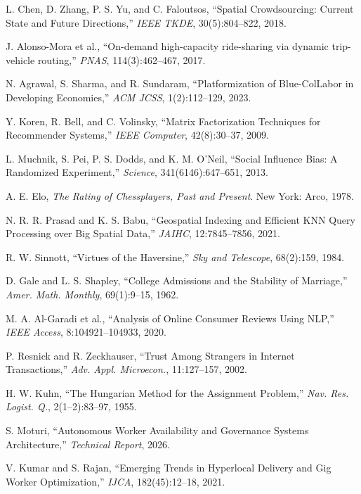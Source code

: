 \documentclass[10pt,twocolumn,a4paper]{article}
\begin{document}
\vspace{0.15em}
{\scriptsize
\setlength{\parskip}{0pt}
\setlength{\itemsep}{0pt}
\noindent [1] L. Chen, D. Zhang, P. S. Yu, and C. Faloutsos, ``Spatial Crowdsourcing: Current State and Future Directions,'' \textit{IEEE TKDE}, 30(5):804--822, 2018.\par
\noindent [2] J. Alonso-Mora et al., ``On-demand high-capacity ride-sharing via dynamic trip-vehicle routing,'' \textit{PNAS}, 114(3):462--467, 2017.\par
\noindent [3] N. Agrawal, S. Sharma, and R. Sundaram, ``Platformization of Blue-ColLabor in Developing Economies,'' \textit{ACM JCSS}, 1(2):112--129, 2023.\par
\noindent [4] Y. Koren, R. Bell, and C. Volinsky, ``Matrix Factorization Techniques for Recommender Systems,'' \textit{IEEE Computer}, 42(8):30--37, 2009.\par
\noindent [5] L. Muchnik, S. Pei, P. S. Dodds, and K. M. O'Neil, ``Social Influence Bias: A Randomized Experiment,'' \textit{Science}, 341(6146):647--651, 2013.\par
\noindent [6] A. E. Elo, \textit{The Rating of Chessplayers, Past and Present}. New York: Arco, 1978.\par
\noindent [7] N. R. R. Prasad and K. S. Babu, ``Geospatial Indexing and Efficient KNN Query Processing over Big Spatial Data,'' \textit{JAIHC}, 12:7845--7856, 2021.\par
\noindent [8] R. W. Sinnott, ``Virtues of the Haversine,'' \textit{Sky and Telescope}, 68(2):159, 1984.\par
\noindent [9] D. Gale and L. S. Shapley, ``College Admissions and the Stability of Marriage,'' \textit{Amer. Math. Monthly}, 69(1):9--15, 1962.\par
\noindent [10] M. A. Al-Garadi et al., ``Analysis of Online Consumer Reviews Using NLP,'' \textit{IEEE Access}, 8:104921--104933, 2020.\par
\noindent [11] P. Resnick and R. Zeckhauser, ``Trust Among Strangers in Internet Transactions,'' \textit{Adv. Appl. Microecon.}, 11:127--157, 2002.\par
\noindent [12] H. W. Kuhn, ``The Hungarian Method for the Assignment Problem,'' \textit{Nav. Res. Logist. Q.}, 2(1--2):83--97, 1955.\par
\noindent [13] S. Moturi, ``Autonomous Worker Availability and Governance Systems Architecture,'' \textit{Technical Report}, 2026.\par
\noindent [14] V. Kumar and S. Rajan, ``Emerging Trends in Hyperlocal Delivery and Gig Worker Optimization,'' \textit{IJCA}, 182(45):12--18, 2021.\par
}
\end{document}
